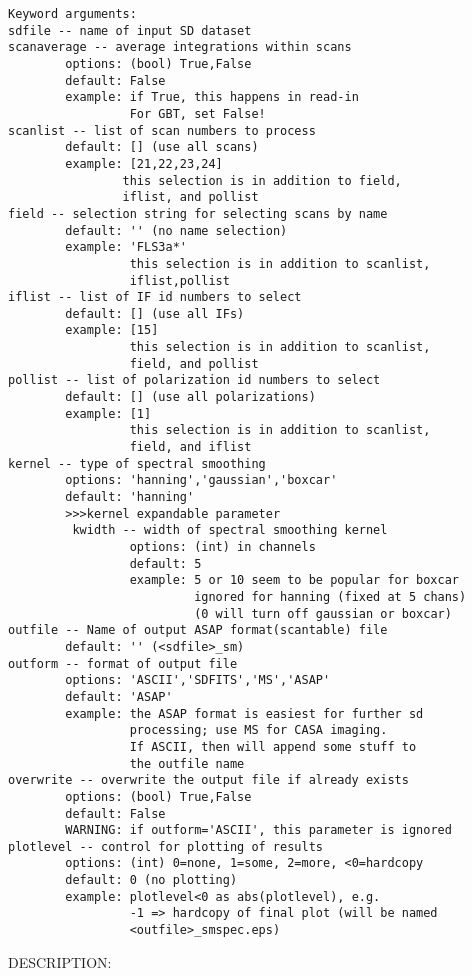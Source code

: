 \begin{verbatim}
Keyword arguments:
sdfile -- name of input SD dataset
scanaverage -- average integrations within scans
        options: (bool) True,False
        default: False
        example: if True, this happens in read-in
                 For GBT, set False!
scanlist -- list of scan numbers to process
        default: [] (use all scans)
        example: [21,22,23,24]
                this selection is in addition to field,
                iflist, and pollist
field -- selection string for selecting scans by name
        default: '' (no name selection)
        example: 'FLS3a*'
                 this selection is in addition to scanlist,
                 iflist,pollist
iflist -- list of IF id numbers to select
        default: [] (use all IFs)
        example: [15]
                 this selection is in addition to scanlist,
                 field, and pollist
pollist -- list of polarization id numbers to select
        default: [] (use all polarizations)
        example: [1]
                 this selection is in addition to scanlist,
                 field, and iflist
kernel -- type of spectral smoothing
        options: 'hanning','gaussian','boxcar'
        default: 'hanning'
        >>>kernel expandable parameter
         kwidth -- width of spectral smoothing kernel
                 options: (int) in channels
                 default: 5
                 example: 5 or 10 seem to be popular for boxcar
                          ignored for hanning (fixed at 5 chans)
                          (0 will turn off gaussian or boxcar)
outfile -- Name of output ASAP format(scantable) file
        default: '' (<sdfile>_sm)
outform -- format of output file
        options: 'ASCII','SDFITS','MS','ASAP'
        default: 'ASAP'
        example: the ASAP format is easiest for further sd
                 processing; use MS for CASA imaging.
                 If ASCII, then will append some stuff to
                 the outfile name
overwrite -- overwrite the output file if already exists
        options: (bool) True,False
        default: False
        WARNING: if outform='ASCII', this parameter is ignored
plotlevel -- control for plotting of results
        options: (int) 0=none, 1=some, 2=more, <0=hardcopy
        default: 0 (no plotting)
        example: plotlevel<0 as abs(plotlevel), e.g.
                 -1 => hardcopy of final plot (will be named
                 <outfile>_smspec.eps)
\end{verbatim}

    DESCRIPTION:

